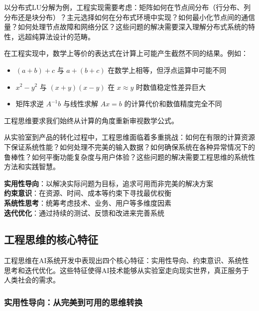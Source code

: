 以分布式LU分解为例，工程实现需要考虑：矩阵如何在节点间分布（行分布、列分布还是块分布）？主元选择如何在分布式环境中实现？如何最小化节点间的通信量？如何处理节点故障和网络分区？这些问题的解决需要深入理解分布式系统的特性，远超纯算法设计的范畴。

\begin{tcolorbox}[colback=red!5!white,colframe=red!75!black,title=警示：数学等价≠计算等价]
在工程实现中，数学上等价的表达式在计算上可能产生截然不同的结果。例如：
\begin{itemize}
\item $(a+b)+c$ 与 $a+(b+c)$ 在数学上相等，但浮点运算中可能不同
\item $x^2-y^2$ 与 $(x+y)(x-y)$ 在 $x \approx y$ 时数值稳定性差异巨大
\item 矩阵求逆 $A^{-1}b$ 与线性求解 $Ax=b$ 的计算代价和数值精度完全不同
\end{itemize}
工程思维要求我们始终从计算的角度重新审视数学公式。
\end{tcolorbox}

从实验室到产品的转化过程中，工程思维面临着多重挑战：如何在有限的计算资源下保证系统性能？如何处理不完美的输入数据？如何确保系统在各种异常情况下的鲁棒性？如何平衡功能复杂度与用户体验？这些问题的解决需要工程思维的系统性方法和实践智慧。

\begin{tcolorbox}[colback=orange!5!white,colframe=orange!75!black,title=核心概念：工程思维的四大支柱]
\textbf{实用性导向}：以解决实际问题为目标，追求可用而非完美的解决方案\\
\textbf{约束意识}：在资源、时间、成本等约束下寻找最优权衡\\
\textbf{系统性思考}：统筹考虑技术、业务、用户等多维度因素\\
\textbf{迭代优化}：通过持续的测试、反馈和改进来完善系统
\end{tcolorbox}

\subsection{工程思维的核心特征}

工程思维在AI系统开发中表现出四个核心特征：实用性导向、约束意识、系统性思考和迭代优化。这些特征使得AI技术能够从实验室走向现实世界，真正服务于人类社会的需求。

\subsubsection{实用性导向：从完美到可用的思维转换}

